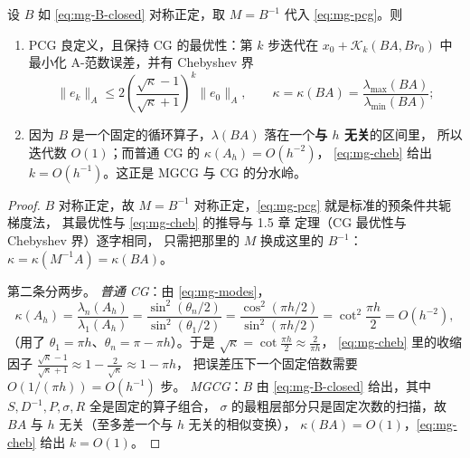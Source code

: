 \begin{theorem}
\label{thm:mg-mgcg}
设 $B$ 如 \eqref{eq:mg-B-closed} 对称正定，取 $M=B^{-1}$ 代入 \eqref{eq:mg-pcg}。则
\begin{enumerate}
  \item PCG 良定义，且保持 CG 的最优性：第 $k$ 步迭代在
        $x_0+\mathcal K_k(BA,Br_0)$ 中最小化 A-范数误差，并有 Chebyshev 界
        \begin{equation}
          \|e_k\|_A\le2\left(\frac{\sqrt\kappa-1}{\sqrt\kappa+1}\right)^{k}\|e_0\|_A,
          \qquad \kappa=\kappa(BA)=\frac{\lambda_{\max}(BA)}{\lambda_{\min}(BA)};
          \label{eq:mg-cheb}
        \end{equation}
  \item 因为 $B$ 是一个固定的循环算子，$\lambda(BA)$ 落在一个\textbf{与 $h$ 无关}的区间里，
        所以迭代数 $O(1)$；而普通 CG 的 $\kappa(A_h)=O(h^{-2})$，
        \eqref{eq:mg-cheb} 给出 $k=O(h^{-1})$。这正是 MGCG 与 CG 的分水岭。
\end{enumerate}
\end{theorem}

\begin{proof}
$B$ 对称正定，故 $M=B^{-1}$ 对称正定，\eqref{eq:mg-pcg} 就是标准的预条件共轭梯度法，
其最优性与 \eqref{eq:mg-cheb} 的推导与 1.5 章 定理（CG 最优性与 Chebyshev 界）逐字相同，
只需把那里的 $M$ 换成这里的 $B^{-1}$：$\kappa=\kappa(M^{-1}A)=\kappa(BA)$。

第二条分两步。
\emph{普通 CG}：由 \eqref{eq:mg-modes}，
\begin{equation}
  \kappa(A_h)=\frac{\lambda_n(A_h)}{\lambda_1(A_h)}
  =\frac{\sin^2(\theta_n/2)}{\sin^2(\theta_1/2)}
  =\frac{\cos^2(\pi h/2)}{\sin^2(\pi h/2)}=\cot^2\frac{\pi h}{2}=O(h^{-2}),
\end{equation}
（用了 $\theta_1=\pi h$、$\theta_n=\pi-\pi h$）。于是 $\sqrt\kappa=\cot\frac{\pi h}{2}\approx\frac{2}{\pi h}$，
\eqref{eq:mg-cheb} 里的收缩因子
$\frac{\sqrt\kappa-1}{\sqrt\kappa+1}\approx1-\frac{2}{\sqrt\kappa}\approx1-\pi h$，
把误差压下一个固定倍数需要 $O(1/(\pi h))=O(h^{-1})$ 步。
\emph{MGCG}：$B$ 由 \eqref{eq:mg-B-closed} 给出，其中 $S,D^{-1},P,\sigma,R$ 全是固定的算子组合，
$\sigma$ 的最粗层部分只是固定次数的扫描，故 $BA$ 与 $h$ 无关（至多差一个与 $h$ 无关的相似变换），
$\kappa(BA)=O(1)$，\eqref{eq:mg-cheb} 给出 $k=O(1)$。
\end{proof}

